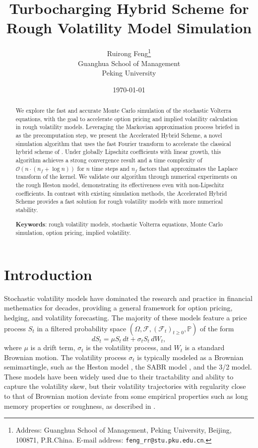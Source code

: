 \documentclass[11pt]{article}%
\theoremstyle{definition}
\begin{document}
\title{Turbocharging Hybrid Scheme for Rough Volatility Model Simulation}
\author{Ruirong Feng\thanks{Address: Guanghua School of Management, Peking University,
Beijing, 100871, P.R.China. E-mail address: \texttt{feng\_rr@stu.pku.edu.cn}.}\\{\footnotesize Guanghua School of Management}\\{\footnotesize Peking University}}
\date{\today }
\maketitle

\begin{abstract}
We explore the fast and accurate Monte Carlo simulation of the stochastic Volterra equations, with the goal to accelerate option pricing and implied volatility calculation in rough volatility models. Leveraging the Markovian approximation process briefed in \cite{abijaber2018} as the precomputation step, we present the Accelerated Hybrid Scheme, a novel simulation algorithm that uses the fast Fourier transform to accelerate the classical hybrid scheme of \cite{bennedsen_2017_FS}. Under globally Lipschitz coefficients with linear growth, this algorithm achieves a strong convergence result and a time complexity of \(\mathcal{O}(n\cdot(n_f +\log n))\) for \(n\) time steps and \(n_f\) factors that approximates the Laplace transform of the kernel. We validate our algorithm through numerical experiments on the rough Heston model, demonstrating its effectiveness even with non-Lipschitz coefficients. In contrast with existing simulation methods, the Accelerated Hybrid Scheme provides a fast solution for rough volatility models with more numerical stability.

\noindent\textbf{Keywords}: rough volatility models, stochastic Volterra equations, Monte Carlo simulation, option pricing, implied volatility.

\end{abstract}

\section{Introduction}

Stochastic volatility models have dominated the research and practice in financial methematics for decades, providing a general framework for option pricing, hedging, and volatility forecasting. The majority of these models feature a price process \(S_t\) in a filtered probability space \((\Omega, \mathcal{F}, (\mathcal{F}_t)_{t\ge 0},\mathbb{P})\) of the form
\[
    dS_t = \mu S_t\,dt + \sigma_t S_t\,dW_t,
\]
where \(\mu\) is a drift term, \(\sigma_t\) is the volatility process, and \(W_t\) is a standard Brownian motion. The volatility process \(\sigma_t\) is typically modeled as a Brownian semimartingle, such as the Heston model \cite{heston93}, the SABR model \cite{SABR_Hagan_etc_2002}, and the 3/2 model. These models have been widely used due to their tractability and ability to capture the volatility skew, but their volatility trajectories with regularity close to that of Brownian motion deviate from some empirical properties such as long memory properties or roughness, as described in \cite{Gatheral2018}.
\end{document}
